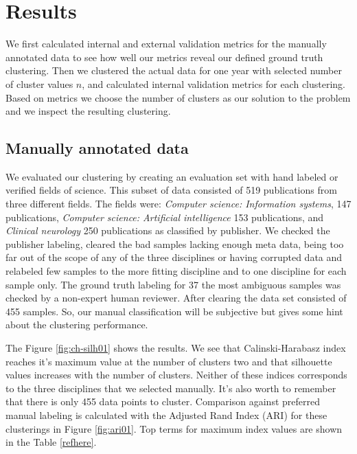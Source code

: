 \chapter{Results}
\label{chapter:results}

We first calculated internal and external validation metrics for 
the manually annotated data to see how well our metrics 
reveal our defined ground truth clustering. Then we clustered 
the actual data for one year with selected number of cluster 
values $n$, and calculated internal validation metrics for
each clustering. Based on metrics we choose the number of clusters
as our solution to the problem and we inspect the resulting
clustering.

\section{Manually annotated data}
We evaluated our clustering by creating an evaluation set with
hand labeled or verified fields of science. This subset of data 
consisted of 519 publications from three different fields. The fields
were: \emph{Computer science: Information systems}, 147 publications,
\emph{Computer science: Artificial intelligence} 153 publications, 
and \emph{Clinical neurology} 250 publications as classified by 
publisher. We checked the publisher labeling, cleared the 
bad samples lacking enough meta data, being too far out of the 
scope of any of the three disciplines or having corrupted data and
relabeled few  samples to the more fitting 
discipline and to one discipline for each sample only. The ground 
truth labeling for 37 the most ambiguous samples was checked by 
a non-expert human reviewer. After clearing the data set consisted 
of 455 samples.  So, our manual classification will
be subjective but gives some hint about the clustering performance.

The Figure \ref{fig:ch-silh01} shows the results. We see that
Calinski-Harabasz index reaches it's maximum value at the number
of clusters two and that silhouette values increases with the
number of clusters.
Neither of these indices corresponds to the three disciplines
that we selected manually. It's also worth to remember that there
is only 455 data points to cluster. Comparison against preferred
manual labeling is calculated with the 
Adjusted Rand Index (ARI) for these clusterings in Figure 
\ref{fig:ari01}.
Top terms for maximum index values are shown in the Table 
\ref{refhere}.



